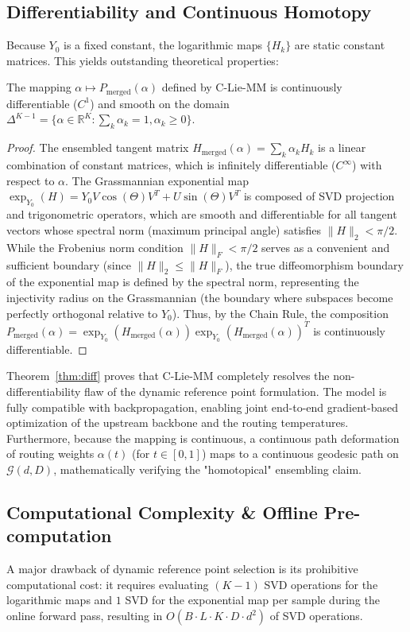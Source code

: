 \subsection{Differentiability and Continuous Homotopy}
Because $Y_0$ is a fixed constant, the logarithmic maps $\{H_k\}$ are static constant matrices. This yields outstanding theoretical properties:

\begin{theorem}
\label{thm:diff}
The mapping $\alpha \mapsto P_{\text{merged}}(\alpha)$ defined by C-Lie-MM is continuously differentiable ($C^1$) and smooth on the domain $\Delta^{K-1} = \{\alpha \in \mathbb{R}^K : \sum_k \alpha_k = 1, \alpha_k \geq 0\}$.
\end{theorem}

\begin{proof}
The ensembled tangent matrix $H_{\text{merged}}(\alpha) = \sum_k \alpha_k H_k$ is a linear combination of constant matrices, which is infinitely differentiable ($C^\infty$) with respect to $\alpha$. The Grassmannian exponential map $\exp_{Y_0}(H) = Y_0 V \cos(\Theta) V^T + U \sin(\Theta) V^T$ is composed of SVD projection and trigonometric operators, which are smooth and differentiable for all tangent vectors whose spectral norm (maximum principal angle) satisfies $\|H\|_2 < \pi/2$. While the Frobenius norm condition $\|H\|_F < \pi/2$ serves as a convenient and sufficient boundary (since $\|H\|_2 \leq \|H\|_F$), the true diffeomorphism boundary of the exponential map is defined by the spectral norm, representing the injectivity radius on the Grassmannian (the boundary where subspaces become perfectly orthogonal relative to $Y_0$). Thus, by the Chain Rule, the composition $P_{\text{merged}}(\alpha) = \exp_{Y_0}(H_{\text{merged}}(\alpha)) \exp_{Y_0}(H_{\text{merged}}(\alpha))^T$ is continuously differentiable.
\end{proof}

Theorem~\ref{thm:diff} proves that C-Lie-MM completely resolves the non-differentiability flaw of the dynamic reference point formulation. The model is fully compatible with backpropagation, enabling joint end-to-end gradient-based optimization of the upstream backbone and the routing temperatures. Furthermore, because the mapping is continuous, a continuous path deformation of routing weights $\alpha(t)$ (for $t \in [0, 1]$) maps to a continuous geodesic path on $\mathcal{G}(d, D)$, mathematically verifying the "homotopical" ensembling claim.

\subsection{Computational Complexity \& Offline Pre-computation}
A major drawback of dynamic reference point selection is its prohibitive computational cost: it requires evaluating $(K-1)$ SVD operations for the logarithmic maps and $1$ SVD for the exponential map per sample during the online forward pass, resulting in $O(B \cdot L \cdot K \cdot D \cdot d^2)$ of SVD operations.


